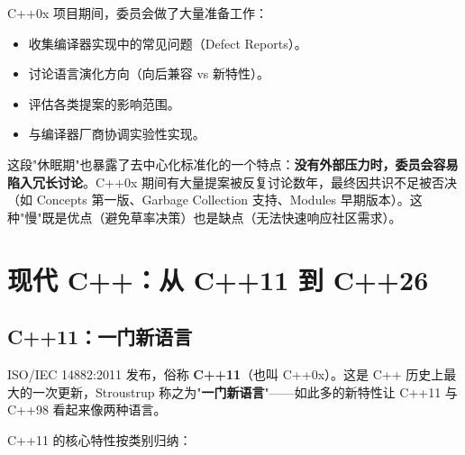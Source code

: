\documentclass[12pt,a4paper,fontset=fandol]{ctexbook}
\newcommand{\yearlabel}[1]{%
  \tcbox[on line,colback=yearheadbg,colframe=yearheadbg,
    boxrule=0pt,arc=1pt,left=3pt,right=3pt,top=1pt,bottom=1pt,
    colupper=white,fontupper=\scriptsize\bfseries]{#1}}
\newcommand{\yrlbl}[1]{\yearlabel{#1}}
\begin{document}
C++0x 项目期间，委员会做了大量准备工作：

\begin{itemize}
  \item 收集编译器实现中的常见问题（Defect Reports）。
  \item 讨论语言演化方向（向后兼容 vs 新特性）。
  \item 评估各类提案的影响范围。
  \item 与编译器厂商协调实验性实现。
\end{itemize}

这段"休眠期"也暴露了去中心化标准化的一个特点：\textbf{没有外部压力时，委员会容易陷入冗长讨论}。C++0x 期间有大量提案被反复讨论数年，最终因共识不足被否决（如 Concepts 第一版、Garbage Collection 支持、Modules 早期版本）。这种"慢"既是优点（避免草率决策）也是缺点（无法快速响应社区需求）。

\chapter{现代 C++：从 C++11 到 C++26}

\section{C++11：一门新语言}

\yrlbl{2011} ISO/IEC 14882:2011 发布，俗称 \textbf{C++11}（也叫 C++0x）。这是 C++ 历史上最大的一次更新，Stroustrup 称之为"\textbf{一门新语言}"——如此多的新特性让 C++11 与 C++98 看起来像两种语言。

C++11 的核心特性按类别归纳：
\end{document}
